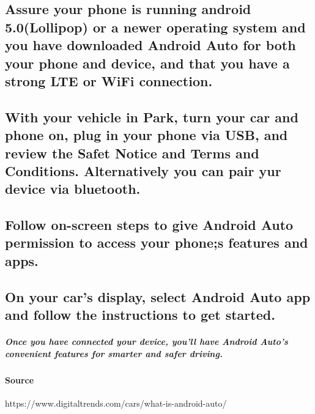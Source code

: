 \documentclass[a4paper, 12pt]{article}
\begin{document}
\subsection{Assure your phone is running android 5.0(Lollipop) or a newer operating system and you have downloaded Android Auto for both your phone and device, and that you have a strong LTE or WiFi connection.}
\subsection{With your vehicle in Park, turn your car and phone on, plug in your phone via USB, and review the Safet Notice and Terms and Conditions. Alternatively you can pair yur device via bluetooth.}
\subsection{Follow on-screen steps to give Android Auto permission to access your phone;s features and apps.}
\subsection{On your car's display, select Android Auto app and follow the instructions to get started.}
\subparagraph{Once you have connected your device, you'll have Android Auto's convenient features for smarter and safer driving.}
\paragraph{Source}https://www.digitaltrends.com/cars/what-is-android-auto/
\end{document}
